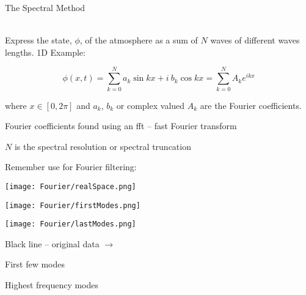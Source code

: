 \begin{slide}{The Spectral Method}

\ \\
Express the state, $\phi$, of the atmosphere as a sum of $N$ waves of different waves lengths. 1D Example:

\[
\phi(x,t) = \sum_{k=0}^{N} a_k \sin kx + i~b_k \cos kx = \sum_{k=0}^N A_k e^{ikx}
\]

where $x\in[0, 2\pi]$ and $a_k$, $b_k$ or complex valued $A_k$ are the Fourier coefficients.

Fourier coefficients found using an fft -- fast Fourier transform

$N$ is the spectral resolution or spectral truncation

Remember use for Fourier filtering:\\
\begin{minipage}{0.32\linewidth}
\texttt{[image: Fourier/realSpace.png]}
\end{minipage}
%
\begin{minipage}{0.32\linewidth}
\texttt{[image: Fourier/firstModes.png]}
\end{minipage}
%
\begin{minipage}{0.32\linewidth}
\texttt{[image: Fourier/lastModes.png]}
\end{minipage}

\begin{minipage}[t]{0.38\linewidth}\centering
Black line -- original data $\rightarrow$
\end{minipage}
%
\begin{minipage}[t]{0.23\linewidth}\centering
First few modes
\end{minipage}
%
\begin{minipage}[t]{0.37\linewidth}\centering
Highest frequency modes
\end{minipage}
\end{slide}

